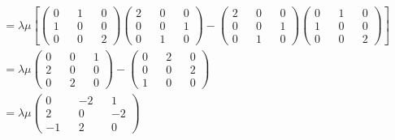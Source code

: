 \documentclass[a4paper, 12pt, notitlepage]{article}
\begin{document}
\begin{enumerate}
\begin{enumerate}[(A)]
  \begin{align*}
  [A, B] &= \lambda \mu \left[ 
  \begin{pmatrix} 
  0 && 1 && 0 \\
  1 && 0 && 0 \\
  0 && 0 && 2
  \end{pmatrix}\begin{pmatrix}
  2 && 0 && 0 \\
  0 && 0 && 1 \\
  0 && 1 && 0  
  \end{pmatrix} - \begin{pmatrix}
  2 && 0 && 0 \\
  0 && 0 && 1 \\
  0 && 1 && 0
  \end{pmatrix} \begin{pmatrix} 
  0 && 1 && 0 \\
  1 && 0 && 0 \\
  0 && 0 && 2
  \end{pmatrix}\right] \\
  &= \lambda \mu \begin{pmatrix}
  0 && 0 && 1 \\
  2 && 0 && 0 \\
  0 && 2 && 0
  \end{pmatrix} - \begin{pmatrix}
  0 && 2 && 0 \\
  0 && 0 && 2 \\
  1 && 0 && 0
  \end{pmatrix} \\
  &= \lambda \mu \begin{pmatrix}
  0 && -2 && 1 \\
  2 && 0 && -2 \\
  -1 && 2 && 0
  \end{pmatrix}
  \end{align*}
  

\end{enumerate}
\end{enumerate}
\end{document}
